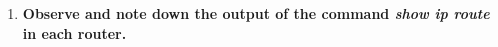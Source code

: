 \documentclass[a4paper,11pt]{article}
\begin{document}
\begin{enumerate}
      \item \textbf{Observe and note down the output of the command \textit{show ip route} in each router.}





\end{enumerate}
\end{document}
